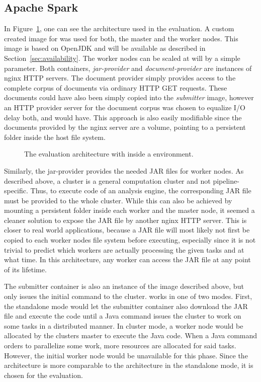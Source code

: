 \subsection{Apache Spark}
\label{ssec:spark}
In Figure~\ref{fig:arch-spark}, one can see the \docker{} architecture used in the evaluation. A custom created image for \spark{} was used for both, the master and the worker nodes. This image is based on OpenJDK and will be available as described in Section~\ref{sec:availability}. The \spark{} worker nodes can be scaled at will by a simple \docker{} parameter. Both containers, \emph{jar-provider} and \emph{document-provider} are  instances of nginx HTTP servers. The document provider simply provides access to the complete corpus of documents via ordinary HTTP GET requests. These documents could have also been simply copied into the \emph{submitter} image, however an HTTP provider server for the document corpus was chosen to equalize I/O delay both, \uimaas{} and \spark{} would have. This approach is also easily modifiable since the documents provided by the nginx server are a volume, pointing to a persistent folder inside the host file system.
\begin{figure}[tbh]
	\centering
	
	\caption[The evaluation architecture with Spark inside a Docker environment.]{The evaluation architecture with \spark{} inside a \docker{} environment.}
	\label{fig:arch-spark}
\end{figure}
Similarly, the jar-provider provides the needed JAR files for \spark{} worker nodes. As described above, a \spark{} cluster is a general computation cluster and not pipeline-specific. Thus, to execute code of an analysis engine, the corresponding JAR file must be provided to the whole cluster. While this can also be achieved by mounting a persistent folder inside each worker and the master node, it seemed a cleaner solution to expose the JAR file by another nginx HTTP server. This is closer to real world applications, because a JAR file will most likely not first be copied to each worker nodes file system before executing, especially since it is not trivial to predict which workers are actually processing the given tasks and at what time. In this architecture, any worker can access the JAR file at any point of its lifetime.

The submitter container is also an instance of the \spark{} image described above, but only issues the initial command to the cluster. \spark{} works in one of two modes. First, the standalone mode would let the submitter container also download the JAR file and execute the code until a Java command issues the cluster to work on some tasks in a distributed manner. In cluster mode, a worker node would be allocated by the clusters master to execute the Java code. When a Java command orders \spark{} to parallelize some work, more resources are allocated for said tasks. However, the initial worker node would be unavailable for this phase. Since the architecture is more comparable to the \uimaas{} architecture in the standalone mode, it is chosen for the evaluation.
